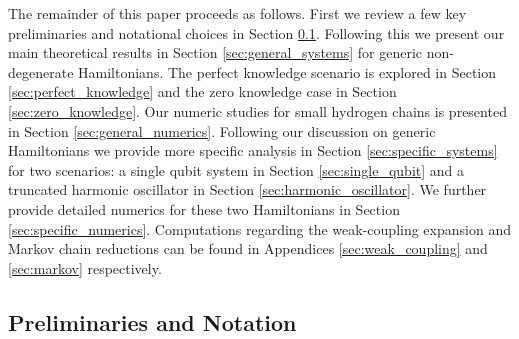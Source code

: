\documentclass[
 amsmath,amssymb,
 aps,
onecolumn, 
nofootinbib]{revtex4-2}
\begin{document}
The remainder of this paper proceeds as follows. First we review a few key preliminaries and notational choices in Section \ref{sec:preliminaries}. Following this we present our main theoretical results in Section \ref{sec:general_systems} for generic non-degenerate Hamiltonians. The perfect knowledge scenario is explored in Section \ref{sec:perfect_knowledge} and the zero knowledge case in Section \ref{sec:zero_knowledge}. Our numeric studies for small hydrogen chains is presented in Section \ref{sec:general_numerics}. Following our discussion on generic Hamiltonians we provide more specific analysis in Section \ref{sec:specific_systems} for two scenarios: a single qubit system in Section \ref{sec:single_qubit} and a truncated harmonic oscillator in Section \ref{sec:harmonic_oscillator}. We further provide detailed numerics for these two Hamiltonians in Section \ref{sec:specific_numerics}. Computations regarding the weak-coupling expansion and Markov chain reductions can be found in Appendices \ref{sec:weak_coupling} and \ref{sec:markov} respectively.


\subsection{Preliminaries and Notation} \label{sec:preliminaries}
\end{document}
